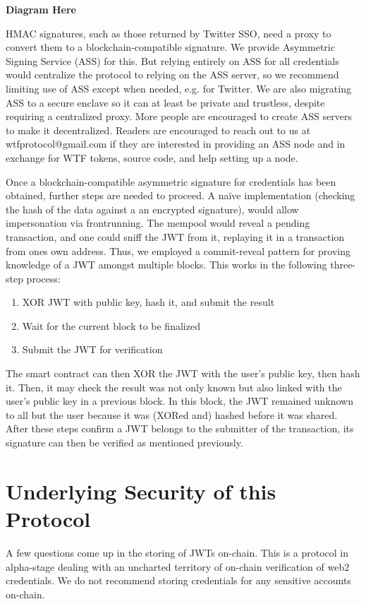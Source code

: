 \documentclass[11pt,oneside,a4paper]{article}
\begin{document}
		\textbf{Diagram Here}
		
	
			HMAC signatures, such as those returned by Twitter SSO,  need a proxy to convert them to a blockchain-compatible signature. We provide Asymmetric Signing Service (ASS) for this. But relying entirely on ASS for all credentials would centralize the protocol to relying on the ASS server, so we recommend limiting use of ASS except when needed, e.g. for Twitter. We are also migrating ASS to a secure enclave so it can at least be private and trustless, despite requiring a centralized proxy. More people are encouraged to create ASS servers to make it decentralized. Readers are encouraged to reach out to us at wtfprotocol@gmail.com if they are interested in providing an ASS node and in exchange for WTF tokens, source code, and help setting up a node.
			
		
			Once a blockchain-compatible asymmetric signature for credentials has been obtained, further steps are needed to proceed. A naïve implementation (checking the hash of the data against a an encrypted signature), would allow impersonation via frontrunning. The mempool would reveal a pending transaction, and one could sniff the JWT from it, replaying it in a transaction from ones own address. Thus, we employed a commit-reveal pattern for proving knowledge of a JWT amongst multiple blocks. This works in the following three-step process:
			\begin{enumerate}
				\item XOR JWT with public key, hash it, and submit the result
				\item Wait for the current block to be finalized
				\item Submit the JWT for verification
			\end{enumerate}	  
			The smart contract can then XOR the JWT with the user's public key, then hash it. Then, it may check the result was not only known but also linked with the user's public key  in a previous block. In this block, the JWT remained unknown to all but the user because it was  (XORed and) hashed before it was shared. After these steps confirm a JWT belongs to the submitter of the transaction, its signature can then be verified as mentioned previously. 
	\section{Underlying Security of this Protocol}
		A few questions come up in the storing of JWTs on-chain. This is a protocol in alpha-stage dealing with an uncharted territory of on-chain verification of web2 credentials. We do not recommend storing credentials for any sensitive accounts on-chain. 
		
\end{document}
